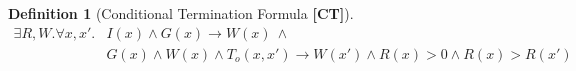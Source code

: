 \documentclass[preprint]{sigplanconf}
\theoremstyle{definition}
\newtheorem{definition}[theorem]{Definition}
\begin{document}
\begin{figure*}
 \begin{framed}

\begin{definition}[Conditional Termination Formula {\bf [CT]}]
\label{def:ct}
 \begin{align*}
  \exists R, W . \forall x, x' . & I(x) \wedge G(x) \rightarrow W(x) ~ \wedge \\
                                 & G(x) \wedge W(x) \wedge T_o(x, x') \rightarrow W(x') \wedge R(x) > 0 
  \wedge R(x) > R(x')
 \end{align*}
\end{definition}




\end{framed}
\end{figure*}
\end{document}
